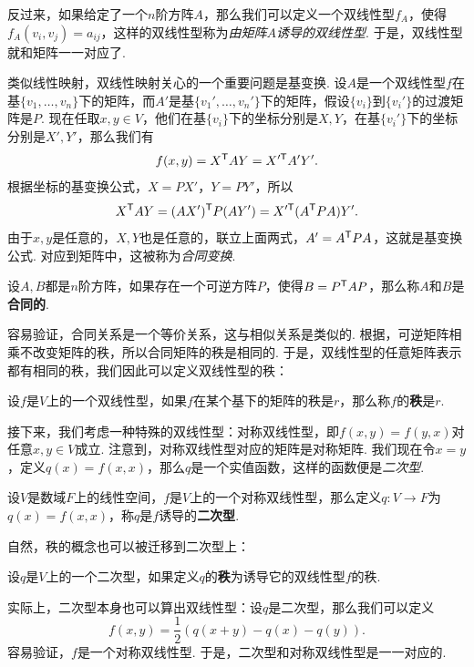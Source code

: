 反过来，如果给定了一个$n$阶方阵$A$，那么我们可以定义一个双线性型$f_A$，使得$f_A(v_i,v_j)=a_{ij}$，这样的双线性型称为\textit{由矩阵$A$诱导的双线性型}. 于是，双线性型就和矩阵一一对应了. 

类似线性映射，双线性映射关心的一个重要问题是基变换. 设$A$是一个双线性型$f$在基$\{v_1,\dots,v_n\}$下的矩阵，而$A'$是基$\{v_1',\dots,v_n'\}$下的矩阵，假设$\{v_i\}$到$\{v_i'\}$的过渡矩阵是$P$. 现在任取$x,y\in V$，他们在基$\{v_i\}$下的坐标分别是$X,Y$，在基$\{v_i'\}$下的坐标分别是$X',Y'$，那么我们有
\[
    f(x,y)=X^{\mathsf{T}} AY=X'^{\mathsf{T}} A'Y'.
\]
根据坐标的基变换公式，$X=PX'$，$Y=PY'$，所以
\[
    X^{\mathsf{T}} AY=(AX')^{\mathsf{T}} P(AY')=X'^{\mathsf{T}} (A^{\mathsf{T}} P A)Y'.
\]
由于$x,y$是任意的，$X,Y$也是任意的，联立上面两式，$A'=A^{\mathsf{T}} P A$，这就是基变换公式. 对应到矩阵中，这被称为\textit{合同变换}. 

\begin{definition}[合同矩阵]\label{def:congruent-matrix}
    设$A,B$都是$n$阶方阵，如果存在一个可逆方阵$P$，使得$B=P^{\mathsf{T}} A P$，那么称$A$和$B$是\textbf{合同的}. 
\end{definition}

容易验证，合同关系是一个等价关系，这与相似关系是类似的. 根据，可逆矩阵相乘不改变矩阵的秩，所以合同矩阵的秩是相同的. 于是，双线性型的任意矩阵表示都有相同的秩，我们因此可以定义双线性型的秩：

\begin{definition}[双线性型的秩]\label{def:bilinear-form-rank}
    设$f$是$V$上的一个双线性型，如果$f$在某个基下的矩阵的秩是$r$，那么称$f$的\textbf{秩}是$r$.
\end{definition}

接下来，我们考虑一种特殊的双线性型：对称双线性型，即$f(x,y)=f(y,x)$对任意$x,y\in V$成立. 注意到，对称双线性型对应的矩阵是对称矩阵. 我们现在令$x=y$，定义$q(x)=f(x,x)$，那么$q$是一个实值函数，这样的函数便是\textit{二次型}. 

\begin{definition}[二次型]\label{def:quadratic-form}
    设$V$是数域$F$上的线性空间，$f$是$V$上的一个对称双线性型，那么定义$q:V\to F$为$q(x)=f(x,x)$，称$q$是$f$诱导的\textbf{二次型}. 
\end{definition}

自然，秩的概念也可以被迁移到二次型上：
\begin{definition}[二次型的秩]\label{def:quadratic-form-rank}
设$q$是$V$上的一个二次型，如果定义$q$的\textbf{秩}为诱导它的双线性型$f$的秩. 
\end{definition}

实际上，二次型本身也可以算出双线性型：设$q$是二次型，那么我们可以定义
\[f(x,y)=\frac{1}{2}(q(x+y)-q(x)-q(y)).\]
容易验证，$f$是一个对称双线性型. 于是，二次型和对称双线性型是一一对应的. 

